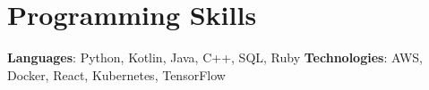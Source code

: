 \section{Programming Skills}
 \resumeSubHeadingListStart
   \item{
     \textbf{Languages}{: Python, Kotlin, Java, C++, SQL, Ruby}
     \hfill
     \textbf{Technologies}{: AWS, Docker, React, Kubernetes, TensorFlow}
   }
 \resumeSubHeadingListEnd